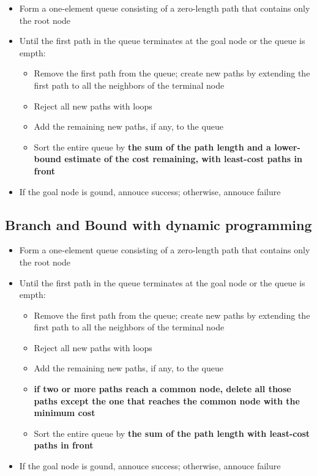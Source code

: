 \documentclass{article}
\begin{document}
\begin{itemize}
  \item Form a one-element queue consisting of a zero-length path 
    that contains only the root node
  \item Until the first path in the queue terminates at the 
    goal node or the queue is empth:
    \begin{itemize}
      \item Remove the first path from the queue; create new paths 
        by extending the first path to all the neighbors
        of the terminal node
      \item Reject all new paths with loops
      \item Add the remaining new paths, if any, to the queue
      \item Sort the entire queue by \textbf{the sum of the path
        length and a lower-bound estimate of the cost
        remaining, with least-cost paths in front}
    \end{itemize}
  \item If the goal node is gound, annouce success; otherwise, 
    annouce failure
\end{itemize}

\subsection{Branch and Bound with dynamic programming}

\begin{itemize}
  \item Form a one-element queue consisting of a zero-length path 
    that contains only the root node
  \item Until the first path in the queue terminates at the 
    goal node or the queue is empth:
    \begin{itemize}
      \item Remove the first path from the queue; create new paths 
        by extending the first path to all the neighbors
        of the terminal node
      \item Reject all new paths with loops
      \item Add the remaining new paths, if any, to the queue
      \item \textbf{if two or more paths reach a common node,
        delete all those paths except the one that reaches the
        common node with the minimum cost}
      \item Sort the entire queue by \textbf{the sum of the path
        length with least-cost paths in front}
    \end{itemize}
  \item If the goal node is gound, annouce success; otherwise, 
    annouce failure
\end{itemize}
\end{document}
